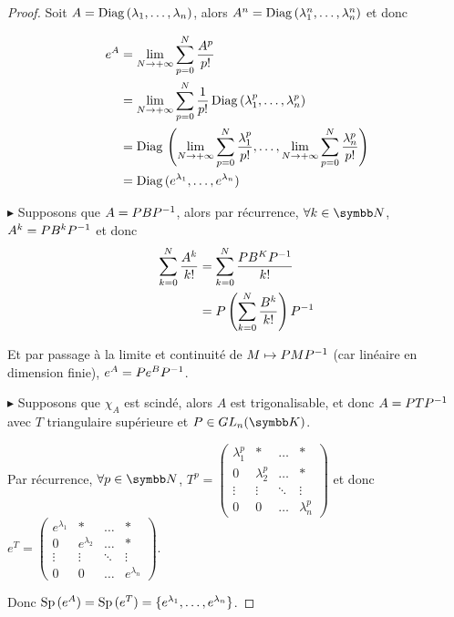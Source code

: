 \begin{proof}
    Soit $A = \operatorname{Diag} \,(\lambda_1, \dots, \lambda_n)$, alors $A^n = \operatorname{Diag} \, (\lambda_1^n, \dots, \lambda_n^n)$ et donc

    \begin{align}
        e^A & = \lim_{N \to + \infty} \sum_{p = 0}^{N} \frac{A^p}{p!} \\
        & = \lim_{N \to + \infty} \sum_{p = 0}^{N} \frac{1}{p!} \operatorname{Diag} \, (\lambda_1^p, \dots, \lambda_n^p) \\
        & = \operatorname{Diag} \, \left( \lim_{N \to + \infty} \sum_{p = 0}^{N} \frac{\lambda_1^p}{p!}, \dots, \lim_{N \to + \infty} \sum_{p = 0}^{N} \frac{\lambda_n^p}{p!} \right) \\
        & = \operatorname{Diag} \, (e^{\lambda_1}, \dots, e^{\lambda_n})
    \end{align}

    \lvspace $\blacktriangleright$ Supposons que $A = PBP^{-1}$, alors par récurrence, 
    $\forall k \in \N$, $A^k = P B^k P^{-1}$ et donc
    \begin{align}
        \sum_{k = 0}^N \frac{A^k}{k!} & = \sum_{k = 0}^{N} \frac{PB^KP^{-1}}{k!} \\
        & = P \left( \sum_{k = 0}^{N} \frac{B^k}{k!} \right) P^{-1}
    \end{align}

    Et par passage à la limite et continuité de $M \mapsto PMP^{-1}$ (car linéaire en 
    dimension finie), $e^A = P e^B P^{-1}$.

    \lvspace $\blacktriangleright$ Supposons que $\chi_A$ est scindé, alors 
    $A$ est trigonalisable, et donc $A = PTP^{-1}$ avec $T$ triangulaire supérieure et $P \in GL_n(\K)$.

    Par récurrence, $\forall p \in \N$, $T^p = \begin{pmatrix}
    \lambda_1^p & * & \dots & * \\
    0 & \lambda_2^p & \dots & * \\
    \vdots & \vdots & \ddots & \vdots \\
    0 & 0 & \dots & \lambda_n^p
    \end{pmatrix}$ et donc $e^T = \begin{pmatrix}
    e^{\lambda_1} & * & \dots & * \\
    0 & e^{\lambda_2} & \dots & * \\
    \vdots & \vdots & \ddots & \vdots \\
    0 & 0 & \dots & e^{\lambda_n}
    \end{pmatrix}$.

    Donc $\operatorname{Sp} \,(e^A) = \operatorname{Sp} \,(e^T) = \{e^{\lambda_1}, \dots, e^{\lambda_n}\}$.
\end{proof}

